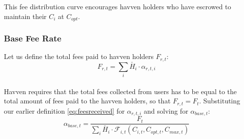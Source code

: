 \begin{center}
\end{center}

\noindent This fee distribution curve encourages havven holders who have escrowed to maintain their $C_i$ at $C_{opt}$.  \\

\newpage

\subsubsection{Base Fee Rate}

Let us define the total fees paid to havven holders $F_{r,t}$: \\

\begin{equation}
F_{r,t} = \sum_{i} \check{H_i} \cdot \alpha_{r,t,i} \label{eq:totalfeesreceived}
\end{equation} \\

\noindent Havven requires that the total fees collected from users has to be equal to the total amount of
fees paid to the havven holders, so that $F_{r,t} = F_t$. Substituting our earlier definition \eqref{eq:feesreceived} for $\alpha_{r,t,i}$ and solving for $\alpha_{base,t} $: \\

\begin{equation}
\alpha_{base,t} = \frac{F_t}{\sum_{i} \check{H_i} \cdot \mathcal{F}_{i,t}(C_{i,t}, C_{opt,t}, C_{max,t})} \label{eq:10}
\end{equation} \\

